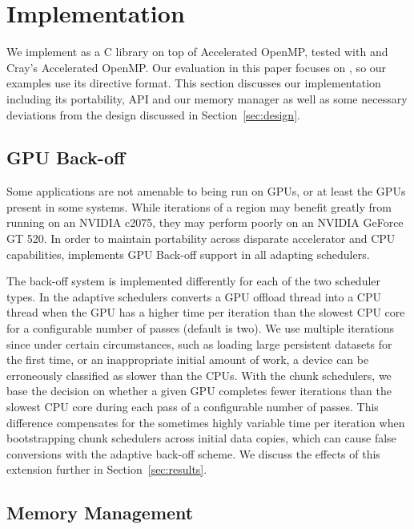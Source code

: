 \section{Implementation}
\label{sec:imp}

We implement \tsar as a C library on top of Accelerated OpenMP, tested with \pgia
and Cray's Accelerated OpenMP. Our evaluation in this paper
focuses on \pgia, so our examples use its directive format.  This section
discusses our implementation including its portability, API and our memory
manager as well as some necessary deviations from the design discussed in
Section~\ref{sec:design}.

\subsection{GPU Back-off}
\label{sec:averse}

Some applications are not amenable to being run on GPUs, or at least the GPUs
present in some systems. While iterations of a region may benefit greatly from
running on an NVIDIA c2075, they may perform poorly on an NVIDIA GeForce GT
520. In order to maintain portability across disparate accelerator and CPU
capabilities, \tsar implements GPU Back-off support in all adapting
schedulers.

The back-off system is implemented differently for each of the two scheduler
types.  In the adaptive schedulers \tsar converts a GPU offload thread into a
CPU thread when the GPU has a higher time per iteration than the slowest CPU
core for a configurable number of passes (default is two). We use multiple
iterations since under certain circumstances, such as loading large persistent
datasets for the first time, or an inappropriate initial amount of work, a
device can be erroneously classified as slower than the CPUs.  With the chunk
schedulers, we base the decision on whether a given GPU completes fewer
iterations than the slowest CPU core during each pass of a configurable number
of passes. This difference compensates for the sometimes highly variable time
per iteration when bootstrapping chunk schedulers across initial data copies,
which can cause false conversions with the adaptive back-off scheme.  We
discuss the effects of this extension further in Section~\ref{sec:results}.

\subsection{Memory Management}
\label{sec:memory}

